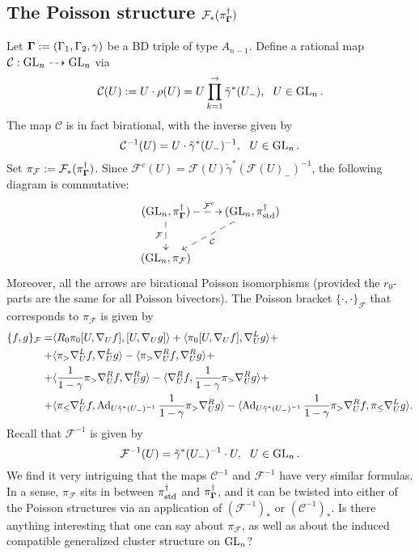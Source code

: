 \subsection{The Poisson structure $\mathcal{F}_*(\pi_{\mathbf{\Gamma}}^{\dagger})$}
Let $\mathbf{\Gamma}:=(\Gamma_1,\Gamma_2,\gamma)$ be a BD triple of type $A_{n-1}$. Define a rational map $\mathcal{C}:\operatorname{GL}_n\dashrightarrow \operatorname{GL}_n$ via
\begin{equation}
    \mathcal{C}(U):=U\cdot \rho(U) = U \prod_{k=1}^{\rightarrow} \tilde{\gamma}^*(U_-), \ \ U \in \operatorname{GL}_n.
\end{equation}
The map $\mathcal{C}$ is in fact birational, with the inverse given by
\begin{equation}\label{eq:cinv}
    \mathcal{C}^{-1}(U) = U\cdot \tilde{\gamma}^*(U_-)^{-1}, \ \ U \in \operatorname{GL}_n.
\end{equation}
Set $\pi_{\mathcal{F}}:= \mathcal{F}_*(\pi_{\mathbf{\Gamma}}^{\dagger})$. Since $\mathcal{F}^c(U) = \mathcal{F}(U) \tilde{\gamma}^*(\mathcal{F}(U)_-)^{-1}$, the following diagram is commutative:
\begin{equation}
\xymatrix{
    (\GL_n,\pi_{\bg}^{\dagger})\ar@{-->}[d]_{\mathcal{F}} \ar@{-->}[r]^{\mathcal{F}^c}  & (\GL_n,\pi_{\std}^{\dagger}) \ar@{-->}[ld]^{\mathcal{C}} \\
     (\GL_n,\pi_{\mathcal{F}})  &
    }
\end{equation}
Moreover, all the arrows are birational Poisson isomorphisms (provided the $r_0$-parts are the same for all Poisson bivectors). The Poisson bracket $\{\cdot , \cdot \}_{\mathcal{F}}$ that corresponds to $\pi_{\mathcal{F}}$ is given by
\begin{equation}\begin{split}
    \{f,g\}_{\mathcal{F}} = &\langle R_0\pi_0[U,\nabla_Uf],[U,\nabla_U g]\rangle + \langle \pi_0[U,\nabla_Uf],\nabla_U^L g\rangle + \\ + &\langle \pi_{>} \nabla^L_Uf,\nabla_U^L g\rangle - \langle \pi_{>}\nabla_U^Rf,\nabla_U^Rg\rangle+\\ + &\langle \frac{1}{1-\gamma}\pi_{>}\nabla_U^R f,\nabla_U^R g\rangle - \langle \nabla_U^R f,\frac{1}{1-\gamma}\pi_{>}\nabla_U^R g\rangle + \\ +&\langle \pi_{\leq} \nabla_U^L f, \operatorname{Ad}_{U\tilde{\gamma}^*(U_-)^{-1}} \frac{1}{1-\gamma}\pi_{>}\nabla_U^R g\rangle - \langle  \operatorname{Ad}_{U\tilde{\gamma}^*(U_-)^{-1}}\frac{1}{1-\gamma} \pi_{>}\nabla_U^R f,\pi_{\leq}\nabla_U^Lg\rangle.
    \end{split}
\end{equation}
Recall that $\mathcal{F}^{-1}$ is given by
\begin{equation}\label{eq:invfapndx}
\mathcal{F}^{-1}(U) = \tilde{\gamma}^*(U_-)^{-1}\cdot U, \ \ U \in \operatorname{GL}_n.
\end{equation}
We find it very intriguing that the maps $\mathcal{C}^{-1}$ and $\mathcal{F}^{-1}$ have very similar formulas. In a sense, $\pi_{\mathcal{F}}$ sits in between $\pi_{\text{std}}^{\dagger}$ and $\pi_{\mathbf{\Gamma}}^{\dagger}$, and it can be twisted into either of the Poisson structures via an application of $(\mathcal{F}^{-1})_*$ or $(\mathcal{C}^{-1})_*$. Is there anything interesting that one can say about $\pi_{\mathcal{F}}$, as well as about the induced compatible generalized cluster structure on $\operatorname{GL}_n$? 

